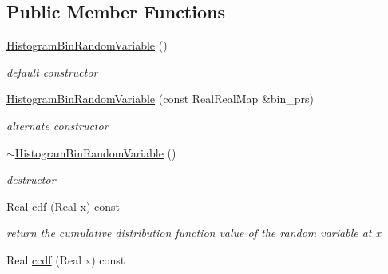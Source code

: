 \subsection*{Public Member Functions}
\begin{DoxyCompactItemize}
\item 
\hyperlink{classPecos_1_1HistogramBinRandomVariable_ac2ab76a2a5022a6ce21d489871a8dca7}{Histogram\+Bin\+Random\+Variable} ()\label{classPecos_1_1HistogramBinRandomVariable_ac2ab76a2a5022a6ce21d489871a8dca7}

\begin{DoxyCompactList}\small\item\em default constructor \end{DoxyCompactList}\item 
\hyperlink{classPecos_1_1HistogramBinRandomVariable_a72f6f79bbd27aefba07871863f4c4ce1}{Histogram\+Bin\+Random\+Variable} (const Real\+Real\+Map \&bin\+\_\+prs)\label{classPecos_1_1HistogramBinRandomVariable_a72f6f79bbd27aefba07871863f4c4ce1}

\begin{DoxyCompactList}\small\item\em alternate constructor \end{DoxyCompactList}\item 
\hyperlink{classPecos_1_1HistogramBinRandomVariable_aea0d3b537e43d84b345d552161c3b3ca}{$\sim$\+Histogram\+Bin\+Random\+Variable} ()\label{classPecos_1_1HistogramBinRandomVariable_aea0d3b537e43d84b345d552161c3b3ca}

\begin{DoxyCompactList}\small\item\em destructor \end{DoxyCompactList}\item 
Real \hyperlink{classPecos_1_1HistogramBinRandomVariable_addd564e7f4f314e12d38df74d845f0d8}{cdf} (Real x) const \label{classPecos_1_1HistogramBinRandomVariable_addd564e7f4f314e12d38df74d845f0d8}

\begin{DoxyCompactList}\small\item\em return the cumulative distribution function value of the random variable at x \end{DoxyCompactList}\item 
Real \hyperlink{classPecos_1_1HistogramBinRandomVariable_a23c3b599e7e4788a9a5e9e93c3dbaf4d}{ccdf} (Real x) const \label{classPecos_1_1HistogramBinRandomVariable_a23c3b599e7e4788a9a5e9e93c3dbaf4d}


\end{DoxyCompactItemize}

